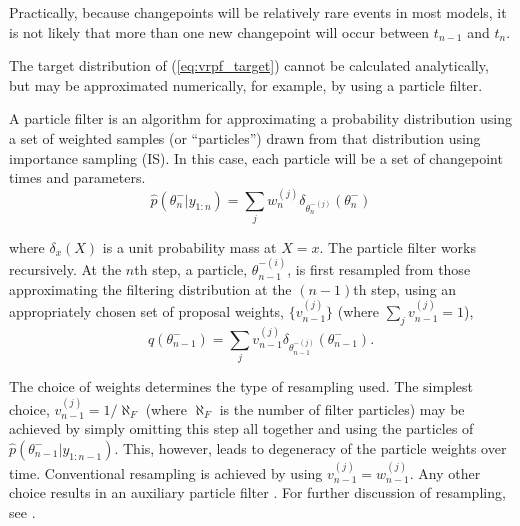 \documentclass[10pt,twocolumn,twoside]{IEEEtran}
\begin{document}

Practically, because changepoints will be relatively rare events in most models, it is not likely that more than one new changepoint will occur between $t_{n-1}$ and $t_n$.

The target distribution of (\ref{eq:vrpf_target}) cannot be calculated analytically, but may be approximated numerically, for example, by using a particle filter.

A particle filter is an algorithm for approximating a probability distribution using a set of weighted samples (or ``particles'') drawn from that distribution using importance sampling (IS). In this case, each particle will be a set of changepoint times and parameters.
%
\begin{equation}
 \hat{p}(\theta_{n}^-|y_{1:n}) = \sum_j w_n^{(j)} \delta_{\theta_{n}^{-(j)}}(\theta_{n}^-) \label{eq:vrpf}
\end{equation}

where $\delta_x(X)$ is a unit probability mass at $X=x$. The particle filter works recursively. At the $n$th step, a particle, $\theta_{n-1}^{-(i)}$, is first resampled from those approximating the filtering distribution at the $(n-1)$th step, using an appropriately chosen set of proposal weights, $\{v_{n-1}^{(j)}\}$ (where $\sum_j v_{n-1}^{(j)} = 1$),
%
\begin{equation}
 q(\theta_{n-1}^-) = \sum_j v_{n-1}^{(j)} \delta_{\theta_{n-1}^{-(j)}}(\theta_{n-1}^-)     .
\end{equation}

The choice of weights determines the type of resampling used. The simplest choice, $v_{n-1}^{(j)} = 1/\aleph_F$ (where $\aleph_F$ is the number of filter particles) may be achieved by simply omitting this step all together and using the particles of $\hat{p}(\theta_{n-1}^-|y_{1:n-1})$. This, however, leads to degeneracy of the particle weights over time. Conventional resampling is achieved by using $v_{n-1}^{(j)} = w_{n-1}^{(j)}$. Any other choice results in an auxiliary particle filter \cite{Pitt1999}. For further discussion of resampling, see \cite{Cappe2007,Doucet2009}.
\end{document}

